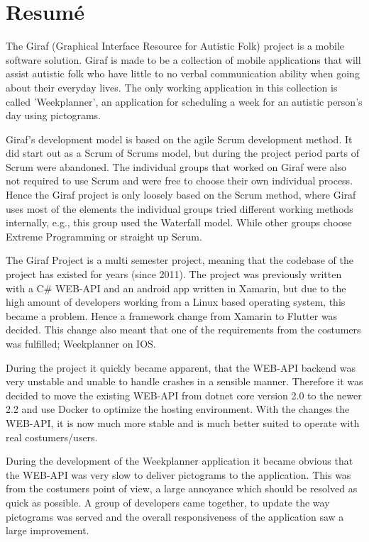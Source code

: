 \chapter*{Resumé}
The Giraf (Graphical Interface Resource for Autistic Folk) project is a mobile software solution.
Giraf is made to be a collection of mobile applications that will assist autistic folk who have little to no verbal communication ability when going about their everyday lives.
The only working application in this collection is called 'Weekplanner', an application for scheduling a week for an autistic person's day using pictograms.

Giraf's development model is based on the agile Scrum development method.
It did start out as a Scrum of Scrums model, but during the project period parts of Scrum were abandoned.
The individual groups that worked on Giraf were also not required to use Scrum and were free to choose their own individual process.
Hence the Giraf project is only loosely based on the Scrum method, where Giraf uses most of the elements the individual groups tried different working methods internally, e.g., this group used the Waterfall model.
While other groups choose Extreme Programming or straight up Scrum. 

The Giraf Project is a multi semester project, meaning that the codebase of the project has existed for years (since 2011). 
The project was previously written with a C\# WEB-API and an android app written in Xamarin, but due to the high amount of developers working from a Linux based operating system, this became a problem. 
Hence a framework change from Xamarin to Flutter was decided. 
This change also meant that one of the requirements from the costumers was fulfilled; Weekplanner on IOS.

During the project it quickly became apparent, that the WEB-API backend was very unstable and unable to handle crashes in a sensible manner. 
Therefore it was decided to move the existing WEB-API from dotnet core version 2.0 to the newer 2.2 and use Docker to optimize the hosting environment. 
With the changes the WEB-API, it is now much more stable and is much better suited to operate with real costumers/users.

During the development of the Weekplanner application it became obvious that the WEB-API was very slow to deliver pictograms to the application. 
This was from the costumers point of view, a large annoyance which should be resolved as quick as possible. 
A group of developers came together, to update the way pictograms was served and the overall responsiveness of the application saw a large improvement.

